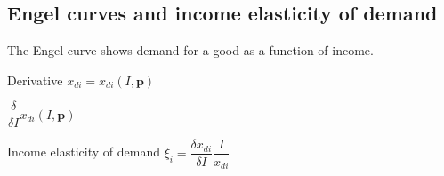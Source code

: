 
\subsection{Engel curves and income elasticity of demand}

The Engel curve shows demand for a good as a function of income.

Derivative
\(x_{di}=x_{di}(I, \mathbf p)\)

\(\dfrac{\delta }{\delta I}x_{di}(I, \mathbf p)\)

Income elasticity of demand
\(\xi_i =\dfrac{\delta x_{di}}{\delta I}\dfrac{I}{x_{di}}\)

